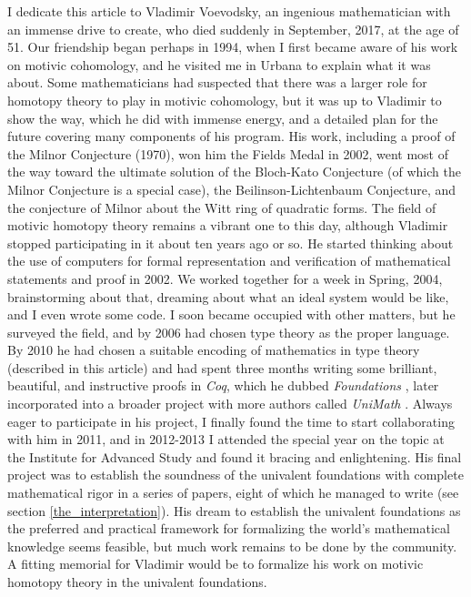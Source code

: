 \documentclass[letter,12pt]{amsart}
\theoremstyle{definition}
\theoremstyle{remark}
\numberwithin{equation}{section}
\begin{document}
I dedicate this article to Vladimir Voevodsky, an ingenious mathematician with an immense drive to create, who died suddenly in September, 2017,
at the age of 51.
Our friendship began perhaps in 1994, when I first became aware of his work on motivic cohomology, and he visited me in Urbana to explain what
it was about.  Some mathematicians had suspected that there was a larger role for homotopy theory to play in motivic cohomology, but it was up
to Vladimir to show the way, which he did with immense energy, and a detailed plan for the future covering many components of his program.  His
work, including a proof of the Milnor Conjecture (1970), won him the Fields Medal in 2002, went most of the way toward the ultimate solution of
the Bloch-Kato Conjecture (of which the Milnor Conjecture is a special case), the Beilinson-Lichtenbaum Conjecture, and the conjecture of Milnor
about the Witt ring of quadratic forms.  The field of motivic homotopy theory remains a vibrant one to this day, although Vladimir stopped
participating in it about ten years ago or so.  He started thinking about the use of computers for formal representation and verification of
mathematical statements and proof in 2002.  We worked together for a week in Spring, 2004, brainstorming about that, dreaming about what an
ideal system would be like, and I even wrote some code.  I soon became occupied with other matters, but he surveyed the field, and by 2006 had
chosen type theory as the proper language.  By 2010 he had chosen a suitable encoding of mathematics in type theory (described in this article)
and had spent three months writing some brilliant, beautiful, and instructive proofs in {\em Coq}, which he dubbed {\em Foundations} \citep{Foundations}, later
incorporated into a broader project with more authors called {\em UniMath} \citep{UniMath}.  Always eager to participate in his project, I finally found the time to start collaborating with him in 2011,
and in 2012-2013 I attended the special year on the topic at the Institute for Advanced Study and found it bracing and enlightening.  His final
project was to establish the soundness of the univalent foundations with complete mathematical rigor in a series of papers, eight of which he managed to write (see section
\ref{the_interpretation}).  His dream to establish the univalent foundations as the preferred and practical framework for formalizing the
world's mathematical knowledge seems feasible, but much work remains to be done by the community.  A fitting memorial for Vladimir would be to
formalize his work on motivic homotopy theory in the univalent foundations.
\end{document}
